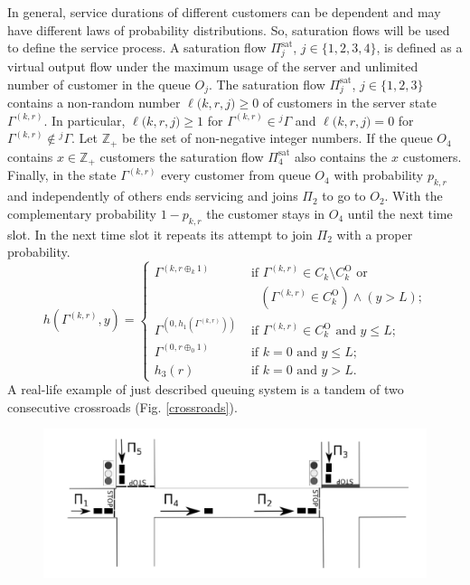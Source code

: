 \documentclass[60x84/16,10pt]{dccn}
\begin{document}
{In general, service durations of different customers can be dependent and may have different laws of
probability distributions. So, saturation flows will be used to define the service process. A
saturation flow $\Pi^{\mathrm{\text{sat}}}_j$, $j \in \{1,2,3,4\}$, is defined as a virtual output
flow under the maximum usage of the server and unlimited number of customer in the queue $O_j$. The
saturation flow $\Pi^{\mathrm{\text{sat}}}_j$, $j\in \{1,2,3\}$ contains a non-random number
$\ell({k,r,j)}\geqslant0$ of customers in the server state $\Gamma^{(k,r)}$. In particular,
$\ell({k,r,j)}\geqslant1$ for $\Gamma^{(k,r)}\in{}^j\Gamma$ and $\ell({k,r,j)}=0$ for
$\Gamma^{(k,r)}\not\in{}^j\Gamma$. Let $\mathbb{Z}_+$ be
the set of non-negative integer numbers. If the queue $O_4$ contains $x \in \mathbb{Z}_+$ customers
the saturation flow $\Pi^{\mathrm{\text{sat}}}_4$ also contains the $x$ customers.  Finally, in the
state $\Gamma^{(k,r)}$ every customer from queue $O_4$ with probability $p_{k,r}$ and independently
of others ends servicing and joins $\Pi_2$ to go to $O_2$. With the complementary probability
$1-p_{k,r}$ the customer stays in $O_4$ until the next time slot. In the next time slot it repeats
its attempt to join $\Pi_2$ with a proper probability.
\begin{equation}
h(\Gamma^{(k,r)},y) = 
\begin{cases}
\Gamma^{(k,r \oplus_k 1)}&  \text{ if  $\Gamma^{(k,r)}\in C_k\setminus C_k^{\mathrm{O}}$ or} \\ & \quad \text{$(\Gamma^{(k,r)}\in C_k^{\mathrm{O}}) \wedge (y>L)$;}\\
\Gamma^{(0,h_1(\Gamma^{(k,r)}))}&  \text{ if  $\Gamma^{(k,r)}\in C_k^{\mathrm{O}}$ and $y\leqslant L$;}\\
\Gamma^{(0,r \oplus_0 1)}&  \text{ if $k=0$ and $y\leqslant L$;}\\
h_3(r)&  \text{ if  $k=0$ and $y > L$.}
\end{cases}
\label{hLaw}
\end{equation}
A real-life example of just described queuing system is a tandem of two consecutive crossroads
(Fig. \ref{crossroads}).
\begin{figure}[h!]
   \centering
    \includegraphics[width=\textwidth]{Crossroads.pdf} 

\end{figure}}
\end{document}
